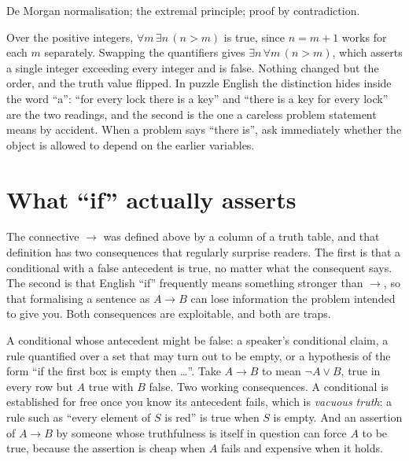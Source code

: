 \begin{seealsob}De Morgan normalisation; the extremal principle; proof by contradiction.\end{seealsob}

\begin{keynote}
Over the positive integers, $\forall m\,\exists n\,(n>m)$ is true, since $n=m+1$ works for each $m$ separately. Swapping the quantifiers gives $\exists n\,\forall m\,(n>m)$, which asserts a single integer exceeding every integer and is false. Nothing changed but the order, and the truth value flipped. In puzzle English the distinction hides inside the word ``a'': ``for every lock there is a key'' and ``there is a key for every lock'' are the two readings, and the second is the one a careless problem statement means by accident. When a problem says ``there is'', ask immediately whether the object is allowed to depend on the earlier variables.
\end{keynote}

\section{What ``if'' actually asserts}

The connective $\to$ was defined above by a column of a truth table, and that definition has two consequences that regularly surprise readers. The first is that a conditional with a false antecedent is true, no matter what the consequent says. The second is that English ``if'' frequently means something stronger than $\to$, so that formalising a sentence as $A\to B$ can lose information the problem intended to give you. Both consequences are exploitable, and both are traps.

\cue A conditional whose antecedent might be false: a speaker's conditional claim, a rule quantified over a set that may turn out to be empty, or a hypothesis of the form ``if the first box is empty then \ldots''.
\method Take $A\to B$ to mean $\lnot A\vee B$, true in every row but $A$ true with $B$ false. Two working consequences. A conditional is established for free once you know its antecedent fails, which is \emph{vacuous truth}: a rule such as ``every element of $S$ is red'' is true when $S$ is empty. And an assertion of $A\to B$ by someone whose truthfulness is itself in question can force $A$ to be true, because the assertion is cheap when $A$ fails and expensive when it holds.

